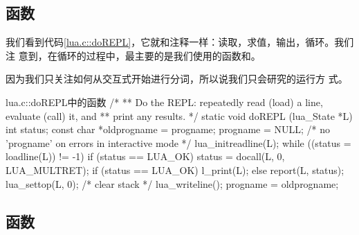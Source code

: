 \subsection{函数}

我们看到代码\ref{lua.c::doREPL}，它就和注释一样：读取，求值，输出，循环。我们注
意到，在循环的过程中，最主要的是我们使用的函数和。

因为我们只关注如何从交互式开始进行分词，所以说我们只会研究的运行方
式。

\begin{ccode}{lua.c::doREPL}{中的函数}
/*
** Do the REPL: repeatedly read (load) a line, evaluate (call) it, and
** print any results.
*/
static void doREPL (lua_State *L) {
  int status;
  const char *oldprogname = progname;
  progname = NULL;  /* no 'progname' on errors in interactive mode */
  lua_initreadline(L);
  while ((status = loadline(L)) != -1) {
    if (status == LUA_OK)
      status = docall(L, 0, LUA_MULTRET);
    if (status == LUA_OK) l_print(L);
    else report(L, status);
  }
  lua_settop(L, 0);  /* clear stack */
  lua_writeline();
  progname = oldprogname;
}
\end{ccode}

\subsection{函数}


